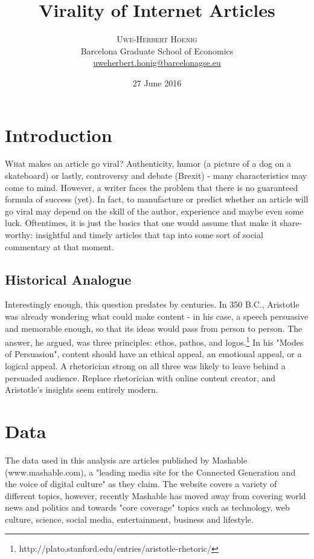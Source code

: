 \documentclass[twoside,twocolumn]{article}
\title{Virality of Internet Articles} %
\author{%
\textsc{Uwe-Herbert Hoenig} \\[1ex] %
\normalsize Barcelona Graduate School of Economics \\ %
\normalsize \href{mailto:uweherbert.honig@barcelonagse.eu}{uweherbert.honig@barcelonagse.eu} %
}
\date{27 June 2016} %
\begin{document}
\maketitle


\section{Introduction}

\lettrine[nindent=0em,lines=3]{W} hat makes an article go viral? Authenticity, humor (a picture of a dog on a skateboard) or lastly, controversy and debate (Brexit) - many characteristics may come to mind. However, a writer faces the problem that there is no guaranteed formula of success (yet). In fact, to manufacture or predict whether an article will go viral may depend on the skill of the author, experience and maybe even some luck. Oftentimes, it is just the basics that one would assume that make it share-worthy: insightful and timely articles that tap into some sort of social commentary at that moment. 

\subsection{Historical Analogue}
Interestingly enough, this question predates by centuries. In 350 B.C., Aristotle was already wondering what could make content - in his case, a speech persuasive and memorable enough, so that its ideas would pass from person to person. The answer, he argued, was three principles: ethos, pathos, and logos.\footnote{http://plato.stanford.edu/entries/aristotle-rhetoric/} In his "Modes of Persuasion", content should have an ethical appeal, an emotional appeal, or a logical appeal. A rhetorician strong on all three was likely to leave behind a persuaded audience. Replace rhetorician with online content creator, and Aristotle's insights seem entirely modern. 

\section{Data}
The data used in this analysis are articles published by Mashable (www.mashable.com), a "leading media site for the Connected Generation and the voice of digital culture" as they claim. The website covers a variety of different topics, however, recently Mashable has moved away from covering world news and politics and towards "core coverage" topics such as technology, web culture, science, social media, entertainment, business and lifestyle.
\end{document}
